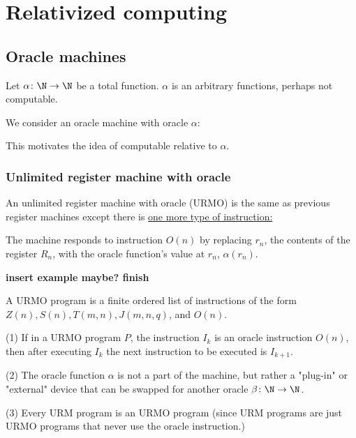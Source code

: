 \documentclass[class=article, crop=false]{standalone}
\begin{document}
\section{Relativized computing}

\subsection{Oracle machines}

Let $\alpha \colon \N\to\N$ be a total function. $\alpha$ is an arbitrary functions, perhaps not computable.

We consider an oracle machine with oracle $\alpha$:

\begin{figure}[ht]
  \center
  \label{fig:oracle-diagram}
\end{figure}

This motivates the idea of computable relative to $\alpha$.

\subsubsection{Unlimited register machine with oracle}

An unlimited register machine with oracle (URMO) is the same as previous register machines except there is \underline{one more type of instruction:}

The machine responds to instruction $O(n)$ by replacing $r_n$, the contents of the register $R_n$, with the oracle function's value at $r_n$, $\alpha(r_n)$.

\textbf{insert example maybe? finish}

A URMO program is a finite ordered list of instructions of the form $Z(n), S(n), T(m,n), J(m,n,q)$, and $O(n)$.

\begin{rem}
  (1) If in a URMO program $P$, the instruction $I_k$ is an oracle instruction $O(n)$, then after executing $I_k$ the next instruction to be executed is $I_{k+1}$.

  (2) The oracle function $\alpha$ is not a part of the machine, but rather a "plug-in" or "external" device that can be swapped for another oracle $\beta\colon \N\to\N$.

  (3) Every URM program is an URMO program (since URM programs are just URMO programs that never use the oracle instruction.)
\end{rem}
\end{document}
